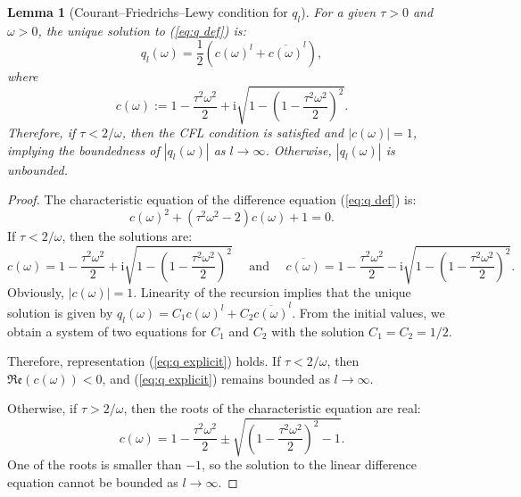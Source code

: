 \documentclass[a4paper,11pt,bibliography=totoc,listof=totoc,headinclude=true,cleardoublepage=empty,oneside]{scrbook}
\newtheorem{lemma}[theorem]{Lemma}
\renewcommand{\i}{\mathrm{i}}
\renewcommand{\Re}{\mathfrak{Re}}
\renewcommand{\eqref}[1]{(\ref{#1})}
\begin{document}
\begin{lemma}[Courant--Friedrichs--Lewy condition for $q_l$]\label{lemma:cfl}
    For a given $\tau > 0$ and $\omega > 0$, the unique solution to \eqref{eq:q def} is:
    \begin{equation}\label{eq:q explicit}
        q_l(\omega) =  \frac{1}{2}\left( c(\omega)^l + \overline{c(\omega)}^l\right),
    \end{equation}
    where 
    \begin{equation*}
        c(\omega) := 1 - \frac{\tau^2 \omega^2}{2} + \i \sqrt{1 - \left(1 - \frac{\tau^2 \omega^2}{2}\right)^2}.
    \end{equation*}
    Therefore, if $\tau < 2/\omega$, then the CFL condition is satisfied and $|c(\omega)|=1$, implying the boundedness of $|q_l(\omega)|$ as $l \rightarrow \infty$. Otherwise, $|q_l(\omega)|$ is unbounded.
\end{lemma}
\begin{proof}
    The characteristic equation of the difference equation \eqref{eq:q def} is:
    \begin{equation*}
        c(\omega)^2 + (\tau^2\omega^2 - 2)c(\omega) + 1 = 0. 
    \end{equation*}
    If $\tau < 2/\omega$, then the solutions are:
    \begin{equation*}
        c(\omega) = 1 - \frac{\tau^2 \omega^2}{2} + \i \sqrt{1 - \left(1 - \frac{\tau^2 \omega^2}{2}\right)^2} \quad \text{ and } \quad \overline{c(\omega)} = 1 - \frac{\tau^2 \omega^2}{2} - \i \sqrt{1 - \left(1 - \frac{\tau^2 \omega^2}{2}\right)^2}.
    \end{equation*}
     Obviously, $|c(\omega)|=1$. Linearity of the recursion implies that the unique solution is given by $q_l(\omega) = C_1 c(\omega)^l + C_2 \overline{c(\omega)}^l$. From the initial values, we obtain a system of two equations for $C_1$ and $C_2$ with the solution $C_1 = C_2 = 1/2$.

    Therefore, representation \eqref{eq:q explicit} holds. If $\tau < 2/\omega$, then $\Re(c(\omega)) < 0$, and \eqref{eq:q explicit} remains bounded as $l\rightarrow \infty$. 
    
    Otherwise, if $\tau > 2/\omega$, then the roots of the characteristic equation are real:
    \begin{equation*}
        c(\omega) = 1 - \frac{\tau^2 \omega^2}{2} \pm \sqrt{\left(1 - \frac{\tau^2 \omega^2}{2}\right)^2 -1 }.
    \end{equation*}
    One of the roots is smaller than $-1$, so the solution to the linear difference equation cannot be bounded as $l\rightarrow\infty$.
\end{proof}
\end{document}
